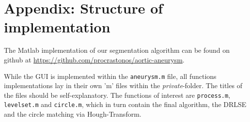 \documentclass[a4paper]{scrartcl}
\begin{document}
\section*{Appendix: Structure of implementation}

The Matlab implementation of our segmentation algorithm can be found on github
at \url{https://github.com/procrastonos/aortic-aneurysm}.

While the GUI is implemented within the \texttt{aneurysm.m} file, all functions
implementations lay in their own 'm' files within the \emph{private}-folder.
The titles of the files should be self-explanatory. The functions of interest
are \texttt{process.m}, \texttt{levelset.m} and \texttt{circle.m}, which in
turn contain the final algorithm, the DRLSE and the circle matching via
Hough-Transform.

 
\end{document}

